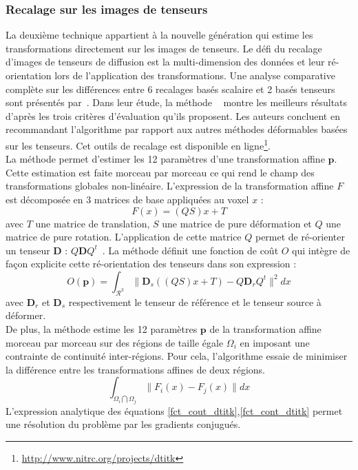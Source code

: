\subsubsection*{Recalage sur les images de tenseurs}
La deuxième technique appartient à la nouvelle génération qui estime les transformations directement sur les images de tenseurs.
Le défi du recalage d'images de tenseurs de diffusion est la multi-dimension des données et leur ré-orientation lors de l'application des transformations.
Une analyse comparative complète sur les différences entre 6 recalages basés scalaire et 2 basés tenseurs sont présentés par~\cite{Wang2011}.
Dans leur étude, la méthode \dtitk~\cite{Zhang2006, Zhang2007, Keihaninejad2013} montre les meilleurs résultats d'après les trois critères d'évaluation qu'ils proposent.
Les auteurs concluent en recommandant l'algorithme \dtitk par rapport aux autres méthodes déformables basées sur les tenseurs.
Cet outils de recalage est disponible en ligne\footnote{\url{http://www.nitrc.org/projects/dtitk}}.\\

La méthode \dtitk permet d'estimer les 12 paramètres d'une transformation affine $\textbf{p}$.
Cette estimation est faite morceau par morceau ce qui rend le champ des transformations globales non-linéaire.
L'expression de la transformation affine $F$ est décomposée en 3 matrices de base appliquées au voxel $x$ : 
\begin{equation}
    F(x) = (QS)x + T
    \label{fct_affine_dtitk}
\end{equation}
avec $T$ une matrice de translation, $S$ une matrice de pure déformation et $Q$ une matrice de pure rotation.
L'application de cette matrice $Q$ permet de ré-orienter un tenseur $\textbf{D}$ : $Q\textbf{D}Q^t$~\cite{Alexander2001}.
La méthode définit une fonction de coût $O$ qui intègre de façon explicite cette ré-orientation des tenseurs dans son expression :
\begin{equation}
    O(\textbf{p}) = \int_{\mathcal{R}^3} \|\textbf{D}_s((QS)x + T) - Q\textbf{D}_rQ^t\|^2dx
    \label{fct_cout_dtitk}
\end{equation}
avec $\textbf{D}_r$ et $\textbf{D}_s$ respectivement le tenseur de référence et le tenseur source à déformer.\\

De plus, la méthode \dtitk estime les 12 paramètres $\textbf{p}$ de la transformation affine morceau par morceau sur des régions de taille égale $\Omega_i$
en imposant une contrainte de continuité inter-régions.
Pour cela, l'algorithme essaie de minimiser la différence entre les transformations affines de deux régions.
\begin{equation}
    \int_{\Omega_i\bigcap\Omega_j} \|F_i(x) - F_j(x)\|dx
    \label{fct_cont_dtitk}
\end{equation}
L'expression analytique des équations \eqref{fct_cout_dtitk},\eqref{fct_cont_dtitk} permet une résolution du problème par les gradients conjugués.\\

